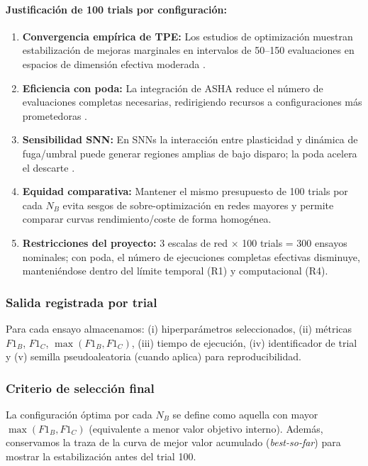 \paragraph{Justificación de 100 trials por configuración:}
\begin{enumerate}
    \item \textbf{Convergencia empírica de TPE:} Los estudios de optimización muestran estabilización de mejoras marginales en intervalos de 50--150 evaluaciones en espacios de dimensión efectiva moderada \cite{bergstra_random_2012, akiba_optuna_2019}.
    \item \textbf{Eficiencia con poda:} La integración de ASHA reduce el número de evaluaciones completas necesarias, redirigiendo recursos a configuraciones más prometedoras \cite{li_system_2020, noauthor_efficient_2021}.
    \item \textbf{Sensibilidad SNN:} En SNNs la interacción entre plasticidad y dinámica de fuga/umbral puede generar regiones amplias de bajo disparo; la poda acelera el descarte \cite{firmin_parallel_2024, parsa_bayesian-based_2019}.
    \item \textbf{Equidad comparativa:} Mantener el mismo presupuesto de 100 trials por cada $N_B$ evita sesgos de sobre-optimización en redes mayores y permite comparar curvas rendimiento/coste de forma homogénea.
    \item \textbf{Restricciones del proyecto:} 3 escalas de red $\times$ 100 trials = 300 ensayos nominales; con poda, el número de ejecuciones completas efectivas disminuye, manteniéndose dentro del límite temporal (R1) y computacional (R4).
\end{enumerate}

\subsubsection{Salida registrada por trial}
Para cada ensayo almacenamos: (i) hiperparámetros seleccionados, (ii) métricas $F1_B$, $F1_C$, $\max(F1_B,F1_C)$, (iii) tiempo de ejecución, (iv) identificador de trial y (v) semilla pseudoaleatoria (cuando aplica) para reproducibilidad.

\subsubsection{Criterio de selección final}
La configuración óptima por cada $N_B$ se define como aquella con mayor $\max(F1_B,F1_C)$ (equivalente a menor valor objetivo interno). Además, conservamos la traza de la curva de mejor valor acumulado (\emph{best-so-far}) para mostrar la estabilización antes del trial 100.

